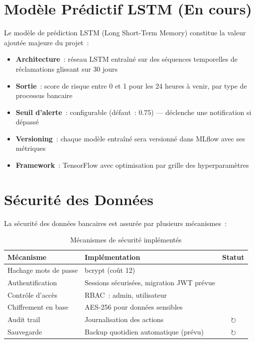 \documentclass[12pt,a4paper]{report}
\newcommand{\done}{\textcolor{greenCheck}{\ding{51}}}
\newcommand{\inprog}{\textcolor{blueProgress}{$\circlearrowright$}}
\begin{document}
\section{Modèle Prédictif LSTM (En cours)}

Le modèle de prédiction LSTM (Long Short-Term Memory) constitue la valeur ajoutée majeure du projet~:

\begin{itemize}[noitemsep]
    \item \textbf{Architecture}~: réseau LSTM entraîné sur des séquences temporelles de réclamations glissant sur 30 jours
    \item \textbf{Sortie}~: score de risque entre 0 et 1 pour les 24 heures à venir, par type de processus bancaire
    \item \textbf{Seuil d'alerte}~: configurable (défaut~: 0.75) --- déclenche une notification si dépassé
    \item \textbf{Versioning}~: chaque modèle entraîné sera versionné dans MLflow avec ses métriques
    \item \textbf{Framework}~: TensorFlow avec optimisation par grille des hyperparamètres
\end{itemize}

\section{Sécurité des Données}

La sécurité des données bancaires est assurée par plusieurs mécanismes~:

\begin{table}[H]
\centering
\caption{Mécanismes de sécurité implémentés}
\begin{tabularx}{\textwidth}{|l|X|c|}
\hline
\textbf{Mécanisme} & \textbf{Implémentation} & \textbf{Statut} \\
\hline
Hachage mots de passe & bcrypt (coût 12) & \done \\
\hline
Authentification & Sessions sécurisées, migration JWT prévue & \done \\
\hline
Contrôle d'accès & RBAC~: admin, utilisateur & \done \\
\hline
Chiffrement en base & AES-256 pour données sensibles & \done \\
\hline
Audit trail & Journalisation des actions & \inprog \\
\hline
Sauvegarde & Backup quotidien automatique (prévu) & \inprog \\
\hline
\end{tabularx}
\end{table}
\end{document}
